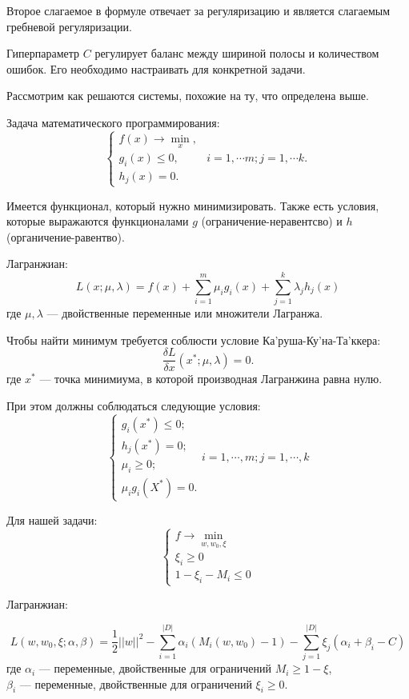 Второе слагаемое в формуле отвечает за регуляризацию и является слагаемым
гребневой регуляризации.

Гиперпараметр $C$ регулирует баланс между шириной полосы и количеством ошибок.
Его необходимо настраивать для конкретной задачи.


Рассмотрим как решаются системы, похожие на ту, что определена выше. 

Задача математического программирования:
\[
    \begin{cases}
        f(x) \to \min_x,
        \\
        g_i(x) \leq 0, & i = 1, \cdots m; j = 1, \cdots k.
        \\
        h_j(x) = 0.
    \end{cases}
\]

Имеется функционал, который нужно минимизировать. Также есть условия, которые
выражаются функционалами $g$ (ограничение-неравентсво) и $h$ (органичение-равентво).

Лагранжиан:
\[
    L(x; \mu, \lambda) = f(x) + \sum_{i=1}^m \mu_i g_i(x) +
    \sum^k_{j=1}\lambda_j h_j (x)
\]
где $\mu, \lambda$ --- двойственные переменные или множители Лагранжа.

Чтобы найти минимум требуется соблюсти условие Ка'руша-Ку'на-Та'ккера:
\[
    \frac{\delta L }{\delta x} (x^*; \mu, \lambda) = 0.
\]
где $x^*$ --- точка минимиума, в которой производная Лагранжина равна нулю.

При этом должны соблюдаться следующие условия:
\[
    \begin{cases}
        g_i(x^*) \leq 0;
        \\
        h_j(x^*) = 0;
        \\
        \mu_i \geq 0;
        \\
        \mu_i g_i(X^*) = 0.
    \end{cases} i = 1, \cdots, m; j = 1, \cdots, k
\]

Для нашей задачи:
\[
    \begin{cases}
        f \to \min_{w, w_0, \xi}
        \\
        \xi_i \geq 0
        \\
        1 - \xi_i - M_i \leq 0
    \end{cases}
\]

Лагранжиан:

\[
    L(w, w_0, \xi; \alpha, \beta) = \frac{1}{2}||w||^2 - \sum^{|D|}_{i=1}
    \alpha_i(M_i(w, w_0) - 1) - \sum^{|D|}_{j=1} \xi_j(\alpha_i + \beta_i - C)
\]
где $\alpha_i$ --- переменные, двойственные для ограничений $M_i \geq 1 -
\xi$,\\
$\beta_i$ --- переменные, двойственные для ограничений $\xi_i \geq 0$.

